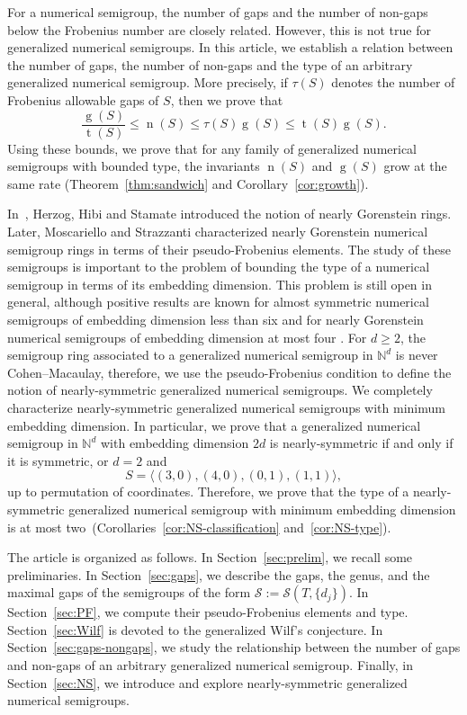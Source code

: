 \documentclass[12pt]{amsart}
\theoremstyle{plain}
\theoremstyle{theorem}
\theoremstyle{remark}
\begin{document}
For a numerical semigroup, the number of gaps and the number of non-gaps below the Frobenius number are closely related. However, this is not true for generalized numerical semigroups. In this article, we establish a relation between the number of gaps, the number of non-gaps and the type of an arbitrary generalized numerical semigroup. More precisely, if $\tau(S)$ denotes the number of Frobenius allowable gaps of $S$, then we prove that
\[
\frac{\operatorname{g}(S)}{\operatorname{t}(S)}
\leq \operatorname{n}(S)
\leq \tau(S)\operatorname{g}(S)
\leq \operatorname{t}(S)\operatorname{g}(S).
\]
Using these bounds, we prove that for any family of generalized numerical semigroups with bounded type, the invariants $\operatorname{n}(S)$ and $\operatorname{g}(S)$ grow at the same rate (Theorem~\ref{thm:sandwich} and Corollary~\ref{cor:growth}). 

In~\cite{Herzog-et-al2019}, Herzog, Hibi and Stamate introduced the notion of nearly Gorenstein rings. Later, Moscariello and Strazzanti \cite{Moscaeiello-Strazzanti2021} characterized nearly Gorenstein numerical semigroup rings in terms of their pseudo-Frobenius elements. The study of these semigroups is important to the problem of bounding the type of a numerical semigroup in terms of its embedding dimension. This problem is still open in general, although positive results are known for almost symmetric numerical semigroups of embedding dimension less than six \cite{Moscariello16,Moscariello23} and for nearly Gorenstein numerical semigroups of embedding dimension at most four \cite{Moscaeiello-Strazzanti2021}. For $d\geq 2$, the semigroup ring associated to a generalized numerical semigroup in $\mathbb{N}^d$ is never Cohen--Macaulay, therefore, we use the pseudo-Frobenius condition to define the notion of nearly-symmetric generalized numerical semigroups. We completely characterize nearly-symmetric generalized numerical semigroups with minimum embedding dimension. In particular, we prove that a generalized numerical semigroup in $\mathbb{N}^d$ with  embedding dimension $2d$ is nearly-symmetric if and only if it is symmetric, or $d=2$ and
$$S=\langle(3,0),(4,0),(0,1),(1,1)\rangle,$$
up to permutation of coordinates. Therefore, we prove that the type of a nearly-symmetric generalized numerical semigroup with minimum embedding dimension is at most two~(Corollaries~\ref{cor:NS-classification} and~\ref{cor:NS-type}).

The article is organized as follows. In Section~\ref{sec:prelim}, we recall some preliminaries. In Section~\ref{sec:gaps}, we describe the gaps, the genus, and the maximal gaps of the semigroups of the form $\mathcal{S}:= \mathcal{S}(T,\{d_j\})$. In Section~\ref{sec:PF}, we compute their pseudo-Frobenius elements and type. Section~\ref{sec:Wilf} is devoted to the generalized Wilf's conjecture. In Section~\ref{sec:gaps-nongaps}, we study the relationship between the number of gaps and non-gaps of an arbitrary generalized numerical semigroup. Finally, in Section~\ref{sec:NS}, we introduce and explore  nearly-symmetric generalized numerical semigroups.
\end{document}
